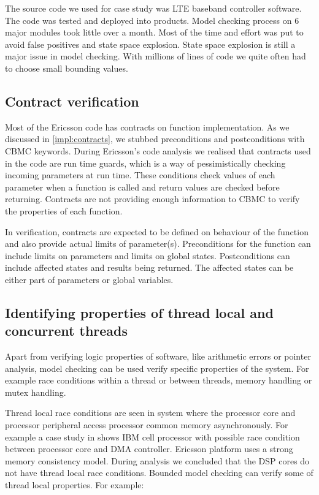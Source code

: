\ifericsson
The source code we used for case study was LTE baseband controller software. The code was tested and deployed into products. Model checking process on 6 major modules took little over a month. Most of the time and effort was put to avoid false positives and state space explosion. State space explosion is still a major issue in model checking. With millions of lines of code we quite often had to choose small bounding values.
\else

\fi

\subsection{Contract verification}
Most of the Ericsson code has contracts on function implementation. As we discussed in \autoref{impl:contracts}, we stubbed preconditions and postconditions with CBMC keywords. During Ericsson's code analysis we realised that contracts used in the code are run time guards, which is a way of pessimistically checking incoming parameters at run time. These conditions check values of each parameter when a function is called and return values are checked before returning. Contracts are not providing enough information to CBMC to verify the properties of each function. 

In verification, contracts are expected to be defined on behaviour of the function and also provide actual limits of parameter(s). Preconditions for the function can include limits on parameters and limits on global states. Postconditions can include affected states and results being returned. The affected states can be either part of parameters or global variables.

\subsection{Identifying properties of thread local and concurrent threads}

Apart from verifying logic properties of software, like arithmetic errors or pointer analysis, model checking can be used verify specific properties of the system. For example race conditions within a thread or between threads, memory handling or mutex handling. 

Thread local race conditions are seen in system where the processor core and processor peripheral access processor common memory asynchronously. For example a case study in \cite{Donaldson:2011:AAD:2034876.2034900} shows IBM cell processor with possible race condition between processor core and DMA controller. Ericsson platform uses a strong memory consistency model. During analysis we concluded that the DSP cores do not have thread local race conditions. Bounded model checking can verify some of thread local properties. For example:

